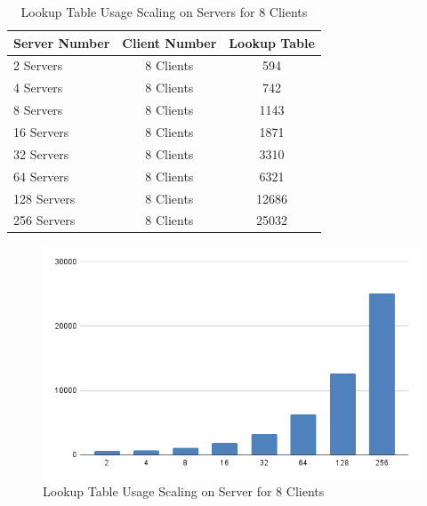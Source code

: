 \begin{table}[htb]
	\centering
	\caption{Lookup Table Usage Scaling on Servers for 8 Clients}
	\begin{tabular}{l c c}
		\toprule
    	Server Number  & Client Number  & Lookup Table\\ \midrule
        2	Servers	&	8	Clients	&	594	\\
        4	Servers	&	8	Clients	&	742	\\
        8	Servers	&	8	Clients	&	1143	\\
        16	Servers	&	8	Clients	&	1871	\\
        32	Servers	&	8	Clients	&	3310	\\
        64	Servers	&	8	Clients	&	6321	\\
        128	Servers	&	8	Clients	&	12686	\\
        256	Servers	&	8	Clients	&	25032	\\
		\bottomrule
	\end{tabular}
	\label{tab:lutc8}
\end{table}

\begin{figure}[h]
	\centering
	\includegraphics[width=.9\linewidth]{figures/Scaling/LUTC8.png}
	\caption{Lookup Table Usage Scaling on Server for 8 Clients}
	\label{fig:lutc8}
\end{figure}

